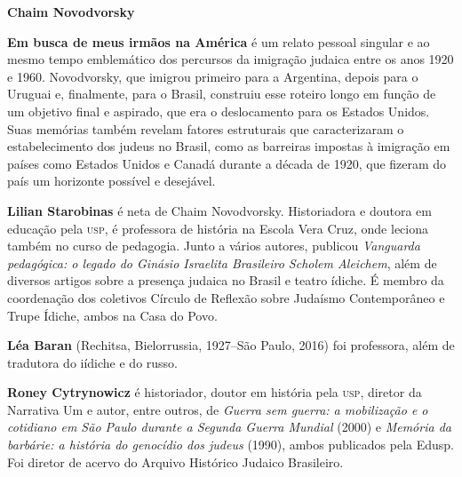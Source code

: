 \textbf{Chaim Novodvorsky} 

\textbf{Em busca de meus irmãos na América} é um relato pessoal singular e ao mesmo tempo emblemático dos percursos da imigração judaica entre os anos 1920 e 1960. Novodvorsky, que imigrou primeiro para a Argentina, depois para o Uruguai e, finalmente, para o Brasil, construiu esse roteiro longo em função de um objetivo final e aspirado, que era o deslocamento para os Estados Unidos. Suas memórias também revelam fatores estruturais que caracterizaram o estabelecimento dos judeus no Brasil, como as barreiras impostas à imigração em países como Estados Unidos e Canadá durante a década de 1920, que fizeram do país um horizonte possível e desejável.

\pagebreak

\textbf{Lilian Starobinas} é neta de Chaim Novodvorsky. Historiadora e doutora em educação pela \textsc{usp}, é professora de história na Escola Vera Cruz, onde leciona também no curso de pedagogia. Junto a vários autores, publicou \textit{Vanguarda pedagógica: o legado do Ginásio Israelita Brasileiro Scholem Aleichem}, além de diversos artigos sobre a presença judaica no Brasil e teatro ídiche. É membro da coordenação dos coletivos Círculo de Reflexão sobre Judaísmo Contemporâneo e Trupe Ídiche, ambos na Casa do Povo.

\textbf{Léa Baran} (Rechitsa, Bielorrussia, 1927--São Paulo, 2016) foi professora, além de tradutora do iídiche e do russo.

\textbf{Roney Cytrynowicz} é historiador, doutor em história pela \textsc{usp}, diretor da Narrativa Um e autor, entre outros, de \textit{Guerra sem guerra: a mobilização e o cotidiano em São Paulo durante a Segunda Guerra Mundial} (2000) e \textit{Memória da barbárie: a história do genocídio dos judeus} (1990), ambos publicados pela Edusp. Foi diretor de acervo do Arquivo Histórico Judaico Brasileiro.




